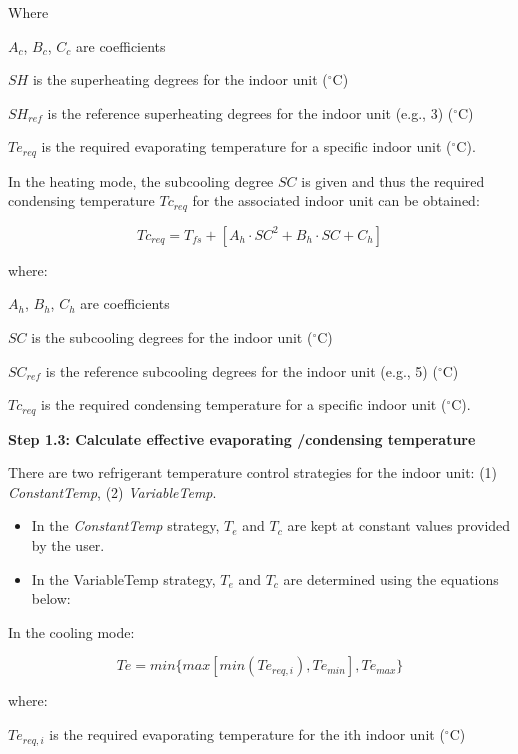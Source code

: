 Where

$A_c$, $B_c$, $C_c$ are coefficients

$SH$ is the superheating degrees for the indoor unit (\(^{\circ}\)C) 

$SH_{ref}$ is the reference superheating degrees for the indoor unit (e.g., 3) (\(^{\circ}\)C)

$Te_{req}$ is the required evaporating temperature for a specific indoor unit (\(^{\circ}\)C).

In the heating mode, the subcooling degree $SC$ is given and thus the required condensing temperature $Tc_{req}$ for the associated indoor unit can be obtained:

\begin{equation}
  Tc_{req}=T_{fs}+[A_h\cdot SC^2+B_h\cdot SC+C_h]
\end{equation}
 
where:

$A_h$, $B_h$, $C_h$ are coefficients

$SC$ is the subcooling degrees for the indoor unit (\(^{\circ}\)C) 

$SC_{ref}$ is the reference subcooling degrees for the indoor unit (e.g., 5) (\(^{\circ}\)C)

$Tc_{req}$ is the required condensing temperature for a specific indoor unit (\(^{\circ}\)C).

\textbf{Step 1.3: Calculate effective evaporating /condensing temperature}

There are two refrigerant temperature control strategies for the indoor unit: (1) \emph{ConstantTemp}, (2) \emph{VariableTemp}.

\begin{itemize}
  \item
    In the \emph{ConstantTemp} strategy, $T_e$ and $T_c$ are kept at constant values provided by the user.

 \item
   In the {VariableTemp} strategy, $T_e$ and $T_c$ are determined using the equations below:
\end{itemize}

In the cooling mode:

\begin{equation}
  Te = min \{ max [ min(Te_{req,i}), Te_{min}], Te_{max}\}
\end{equation}
 
where:

$Te_{req,i}$ is the required evaporating temperature for the ith indoor unit (\(^{\circ}\)C)


